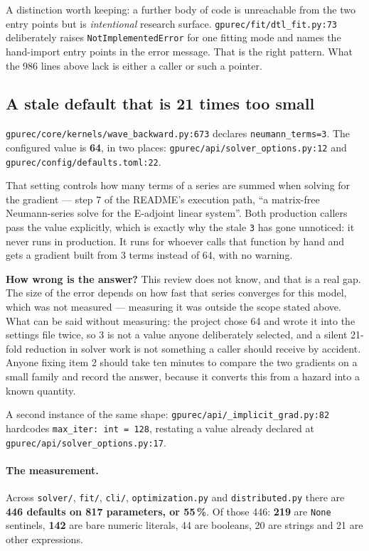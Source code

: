 \documentclass[11pt]{article}
\newcommand{\loc}[1]{\nolinkurl{#1}}
\newcommand{\dir}[1]{\nolinkurl{#1}}
\begin{document}
A distinction worth keeping: a further body of code is unreachable from the two
entry points but is \emph{intentional} research surface.
\loc{gpurec/fit/dtl\_fit.py:73} deliberately raises \texttt{NotImplementedError}
for one fitting mode and names the hand-import entry points in the error
message.  That is the right pattern.  What the 986 lines above lack is either a
caller or such a pointer.

\subsection{A stale default that is 21 times too small}
\label{sec:stale-default}

\loc{gpurec/core/kernels/wave\_backward.py:673} declares
\texttt{neumann\_terms=3}.  The configured value is \textbf{64}, in two places:
\loc{gpurec/api/solver\_options.py:12} and
\loc{gpurec/config/defaults.toml:22}.

That setting controls how many terms of a series are summed when solving for
the gradient --- step 7 of the README's execution path, ``a matrix-free
Neumann-series solve for the E-adjoint linear system''.  Both production callers
pass the value explicitly, which is exactly why the stale \texttt{3} has gone
unnoticed: it never runs in production.  It runs for whoever calls that function
by hand and gets a gradient built from 3 terms instead of 64, with no warning.

\textbf{How wrong is the answer?}  This review does not know, and that is a real
gap.  The size of the error depends on how fast that series converges for this
model, which was not measured --- measuring it was outside the scope stated
above.  What can be said without measuring: the project chose 64 and wrote it
into the settings file twice, so 3 is not a value anyone deliberately selected,
and a silent 21-fold reduction in solver work is not something a caller should
receive by accident.  Anyone fixing item 2 should take ten minutes to compare
the two gradients on a small family and record the answer, because it converts
this from a hazard into a known quantity.

A second instance of the same shape: \loc{gpurec/api/\_implicit\_grad.py:82}
hardcodes \texttt{max\_iter: int = 128}, restating a value already declared at
\loc{gpurec/api/solver\_options.py:17}.

\paragraph{The measurement.}  Across \dir{solver/}, \dir{fit/}, \dir{cli/},
\dir{optimization.py} and \dir{distributed.py} there are \textbf{446 defaults on
817 parameters, or 55\,\%}.  Of those 446: \textbf{219} are \texttt{None}
sentinels, \textbf{142} are bare numeric literals, 44 are booleans, 20 are
strings and 21 are other expressions.
\end{document}
